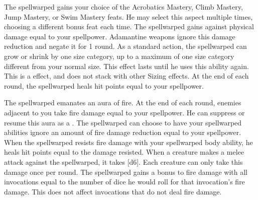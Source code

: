         The spellwarped gains your choice of the Acrobatics Mastery, Climb Mastery, Jump Mastery, or Swim Mastery feats.
        He may select this aspect multiple times, choosing a different bonus feat each time.
        The spellwarped gains  against physical damage equal to your spellpower.
        Adamantine weapons ignore this damage reduction and negate it for 1 round.
        As a standard action, the spellwarped can grow or shrink by one size category, up to a maximum of one size category different from your normal size.
        This effect lasts until he uses this ability again.
        This is a  effect, and does not stack with other Sizing effects.
        At the end of each round, the spellwarped heals hit points equal to your spellpower.

        The spellwarped emanates an aura of fire.
        At the end of each round, enemies adjacent to you take fire damage equal to your spellpower.
        He can suppress or resume this aura as a .
        The spellwarped can choose to have your spellwarped abilities ignore an amount of fire damage reduction equal to your spellpower.
        When the spellwarped resists fire damage with your spellwarped body ability, he heals hit points equal to the damage resisted.
        When a creature makes a melee attack against the spellwarped, it takes [d6].
        Each creature can only take this damage once per round.
        The spellwarped gains a bonus to fire damage with all invocations equal to the number of dice he would roll for that invocation's fire damage.
        This does not affect invocations that do not deal fire damage.

